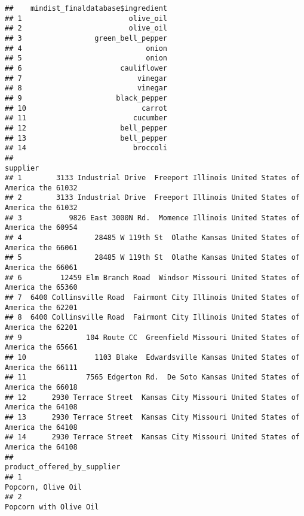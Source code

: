 \documentclass[]{article}
\begin{document}
\begin{verbatim}
##    mindist_finaldatabase$ingredient
## 1                         olive_oil
## 2                         olive_oil
## 3                 green_bell_pepper
## 4                             onion
## 5                             onion
## 6                       cauliflower
## 7                           vinegar
## 8                           vinegar
## 9                      black_pepper
## 10                           carrot
## 11                         cucumber
## 12                      bell_pepper
## 13                      bell_pepper
## 14                         broccoli
##                                                                             supplier
## 1        3133 Industrial Drive  Freeport Illinois United States of America the 61032
## 2        3133 Industrial Drive  Freeport Illinois United States of America the 61032
## 3           9826 East 3000N Rd.  Momence Illinois United States of America the 60954
## 4                 28485 W 119th St  Olathe Kansas United States of America the 66061
## 5                 28485 W 119th St  Olathe Kansas United States of America the 66061
## 6         12459 Elm Branch Road  Windsor Missouri United States of America the 65360
## 7  6400 Collinsville Road  Fairmont City Illinois United States of America the 62201
## 8  6400 Collinsville Road  Fairmont City Illinois United States of America the 62201
## 9               104 Route CC  Greenfield Missouri United States of America the 65661
## 10                1103 Blake  Edwardsville Kansas United States of America the 66111
## 11              7565 Edgerton Rd.  De Soto Kansas United States of America the 66018
## 12      2930 Terrace Street  Kansas City Missouri United States of America the 64108
## 13      2930 Terrace Street  Kansas City Missouri United States of America the 64108
## 14      2930 Terrace Street  Kansas City Missouri United States of America the 64108
##                                                                                                                                                                                                                                         product_offered_by_supplier
## 1                                                                                                                                                                                                                                                Popcorn, Olive Oil
## 2                                                                                                                                                                                                                                            Popcorn with Olive Oil

\end{verbatim}
\end{document}
